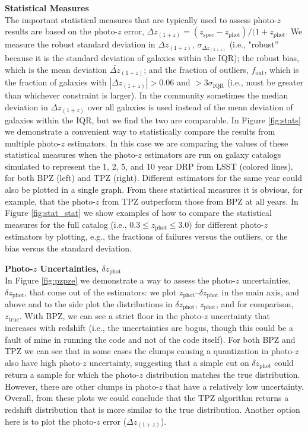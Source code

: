 \documentclass[DM,lsstdraft,toc]{lsstdoc}
\begin{document}
\smallskip \noindent \textbf{Statistical Measures} \\
The important statistical measures that are typically used to assess photo-$z$ results are based on the photo-$z$ error, $\Delta z_{(1+z)} = (z_\mathrm{spec}-z_\mathrm{phot})/(1+z_\mathrm{phot}$. We measure the robust standard deviation in $\Delta z_{(1+z)}$, $\sigma_{\Delta z_{(1+z)}}$ (i.e., "robust'' because it is the standard deviation of galaxies within the IQR); the robust bias, which is the mean deviation $\overline{\Delta z}_{(1+z)}$; and the fraction of outliers, $f_\mathrm{out}$, which is the fraction of galaxies with $|\Delta z_{(1+z)}|> 0.06$ and $>3\sigma_\mathrm{IQR}$ (i.e., must be greater than whichever constraint is larger). In the community sometimes the median deviation in $\Delta z_{(1+z)}$ over all galaxies is used instead of the mean deviation of galaxies within the IQR, but we find the two are comparable. In Figure \ref{fig:stats} we demonstrate a convenient way to statistically compare the results from multiple photo-$z$ estimators. In this case we are comparing the values of these statistical measures when the photo-$z$ estimators are run on galaxy catalogs simulated to represent the 1, 2, 5, and 10 year DRP from LSST (colored lines), for both BPZ (left) and TPZ (right). Different estimators for the same year could also be plotted in a single graph. From these statistical measures it is obvious, for example, that the photo-$z$ from TPZ outperform those from BPZ at all years. In Figure \ref{fig:stat_stat} we show examples of how to compare the statistical measures for the full catalog (i.e., $0.3 \leq z_\mathrm{phot} \leq 3.0$) for different photo-$z$ estimators by plotting, e.g., the fractions of failures versus the outliers, or the bias versus the standard deviation.

\smallskip \noindent \textbf{Photo-$z$ Uncertainties, $\delta z_\mathrm{phot}$} \\
In Figure \ref{fig:pzpze} we demonstrate a way to assess the photo-$z$ uncertainties, $\delta z_\mathrm{phot}$, that come out of the estimators: we plot $z_\mathrm{phot}$--$\delta z_\mathrm{phot}$ in the main axis, and above and to the side plot the distributions in $\delta z_\mathrm{phot}$, $z_\mathrm{phot}$, and for comparison, $z_\mathrm{true}$. With BPZ, we can see a strict floor in the photo-$z$ uncertainty that increases with redshift (i.e., the uncertainties are bogus, though this could be a fault of mine in running the code and not of the code itself). For both BPZ and TPZ we can see that in some cases the clumps causing a quantization in photo-$z$ also have high photo-$z$ uncertainty, suggesting that a simple cut on $\delta z_\mathrm{phot}$ could return a sample for which the photo-$z$ distribution matches the true distribution. However, there are other clumps in photo-$z$ that have a relatively low uncertainty. Overall, from these plots we could conclude that the TPZ algorithm returns a redshift distribution that is more similar to the true distribution. Another option here is to plot the photo-$z$ error ($\Delta z_{(1+z)}$).
\end{document}
